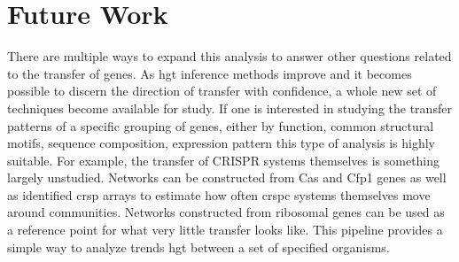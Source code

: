 \section*{\huge Future Work}
There are multiple ways to expand this analysis to answer other questions related to the transfer of genes.
As \ac{hgt} inference methods improve and it becomes possible to discern the direction of transfer with confidence, a whole new set of techniques become available for study.
If one is interested in studying the transfer patterns of a specific grouping of genes, either by function, common structural motifs, sequence composition, expression pattern this type of analysis is highly suitable.
For example, the transfer of CRISPR systems themselves is something largely unstudied.
Networks can be constructed from Cas and Cfp1 genes as well as identified \ac{crsp} arrays to estimate how often \ac{crspc} systems themselves move around communities.
Networks constructed from ribosomal genes can be used as a reference point for what very little transfer looks like.
This pipeline provides a simple way to analyze trends \ac{hgt} between a set of specified organisms.

